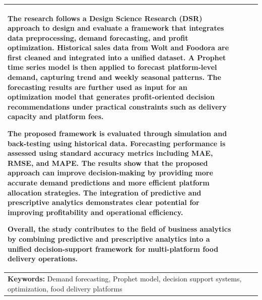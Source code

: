 {\begin{table}[!ht]
\begin{tabular}{llll}
{The research follows a Design Science Research (DSR) approach to design and evaluate a framework that integrates data preprocessing, demand forecasting, and profit optimization. Historical sales data from Wolt and Foodora are first cleaned and integrated into a unified dataset. A Prophet time series model is then applied to forecast platform-level demand, capturing trend and weekly seasonal patterns. The forecasting results are further used as input for an optimization model that generates profit-oriented decision recommendations under practical constraints such as delivery capacity and platform fees.

The proposed framework is evaluated through simulation and back-testing using historical data. Forecasting performance is assessed using standard accuracy metrics including MAE, RMSE, and MAPE. The results show that the proposed approach can improve decision-making by providing more accurate demand predictions and more efficient platform allocation strategies. The integration of predictive and prescriptive analytics demonstrates clear potential for improving profitability and operational efficiency.

Overall, the study contributes to the field of business analytics by combining predictive and prescriptive analytics into a unified decision-support framework for multi-platform food delivery operations.

} \\

\hline

\multicolumn{4}{p{14.5cm}}{
\textbf{Keywords:} Demand forecasting, Prophet model, decision support systems, optimization, food delivery platforms
} 


\end{tabular}
\end{table}
}